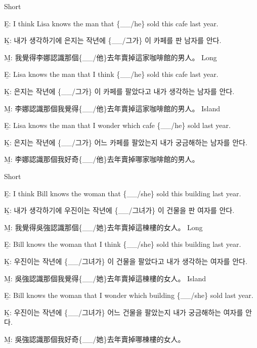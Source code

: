 \pex %
\a Short\par\nobreak
\beginsubsub
\b{E:} I think Lisa knows the man that \{\_\_/he\} sold this cafe last year.\par\nobreak
\b{K:} \ko 내가 생각하기에 은지는 작년에 \{\_\_/그가\} 이 카페를 판 남자를 안다. \normalfont\par\nobreak
\b{M:} \zh 我覺得李娜認識那個\{\_\_/他\}去年賣掉這家咖啡館的男人。 \normalfont
\endsubsub
\a Long\par\nobreak
\beginsubsub
\b{E:} Lisa knows the man that I think \{\_\_/he\} sold this cafe last year.\par\nobreak
\b{K:} \ko 은지는 작년에 \{\_\_/그가\} 이 카페를 팔았다고 내가 생각하는 남자를 안다. \normalfont\par\nobreak
\b{M:} \zh 李娜認識那個我覺得\{\_\_/他\}去年賣掉這家咖啡館的男人。 \normalfont
\endsubsub
\a Island\par\nobreak
\beginsubsub
\b{E:} Lisa knows the man that I wonder which cafe \{\_\_/he\} sold last year.\par\nobreak
\b{K:} \ko 은지는 작년에 \{\_\_/그가\} 어느 카페를 팔았는지 내가 궁금해하는 남자를 안다\normalfont.\par\nobreak
\b{M:} \zh 李娜認識那個我好奇\{\_\_/他\}去年賣掉哪家咖啡館的男人。\normalfont
\endsubsub
\xe

\pex %
\a Short\par\nobreak
\beginsubsub
\b{E:} I think Bill knows the woman that \{\_\_/she\} sold this building last year.\par\nobreak
\b{K:} \ko 내가 생각하기에 우진이는 작년에 \{\_\_/그녀가\} 이 건물을 판 여자를 안다. \normalfont\par\nobreak
\b{M:} \zh 我覺得吳強認識那個\{\_\_/她\}去年賣掉這棟樓的女人。 \normalfont
\endsubsub
\a Long\par\nobreak
\beginsubsub
\b{E:} Bill knows the woman that I think \{\_\_/she\} sold this building last year.\par\nobreak
\b{K:} \ko 우진이는 작년에 \{\_\_/그녀가\} 이 건물을 팔았다고 내가 생각하는 여자를 안다. \normalfont\par\nobreak
\b{M:} \zh 吳強認識那個我覺得\{\_\_/她\}去年賣掉這棟樓的女人。 \normalfont
\endsubsub
\a Island\par\nobreak
\beginsubsub
\b{E:} Bill knows the woman that I wonder which building \{\_\_/she\} sold last year.\par\nobreak
\b{K:} \ko 우진이는 작년에 \{\_\_/그녀가\} 어느 건물을 팔았는지 내가 궁금해하는 여자를 안다\normalfont.\par\nobreak
\b{M:} \zh 吳強認識那個我好奇\{\_\_/她\}去年賣掉哪棟樓的女人。\normalfont
\endsubsub
\xe

